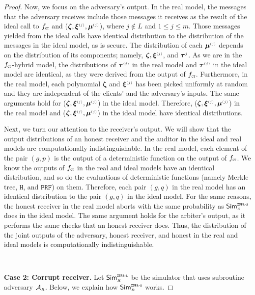 \begin{proof}
 Now, we focus on the adversary’s output. In the real model, the messages that the adversary receives include those messages it receives as the result of the ideal call to $f_{\scriptscriptstyle \mathtt{CT}}$ and (${\bm \zeta}, {\bm\xi}^{\scriptscriptstyle (j)}, \bm\mu^{\scriptscriptstyle (j)}$), where $j \notin L$ and $1\leq j\leq m$. Those messages yielded from the ideal calls have identical distribution to the distribution of the messages in the ideal model, as \ct is secure. The distribution of each $\bm\mu^{\scriptscriptstyle (j)}$ depends on the distribution of its components; namely, ${\bm \zeta}, {\bm\xi}^{\scriptscriptstyle (j)}$, and $\bm \tau^{\scriptscriptstyle j}$. As we are in the $f_{\scriptscriptstyle \mathtt{CT}}$-hybrid model, the distributions of $\bm \tau^{\scriptscriptstyle (j)}$ in the real model and ${\bm \tau}^{\scriptscriptstyle (j)}$ in the ideal model are identical, as they were derived from the output of $f_{\scriptscriptstyle \mathtt{CT}}$. Furthermore, in the real model, each polynomial  ${\bm \zeta}$ and ${\bm\xi}^{\scriptscriptstyle (j)}$ has been picked uniformly at random and they are independent of the clients' and the adversary's inputs. The same arguments hold for  ($ {\bm \zeta}, {\bm\xi}^{\scriptscriptstyle (j)}, {\bm\mu}^{\scriptscriptstyle (j)}$) in the ideal model. Therefore, (${\bm \zeta}, {\bm\xi}^{\scriptscriptstyle (j)}, {\bm\mu}^{\scriptscriptstyle (j)}$) in the real model and ($ {\bm \zeta}, {\bm\xi}^{\scriptscriptstyle (j)}, {\bm\mu}^{\scriptscriptstyle (j)}$) in the ideal model have identical distributions. 
 
 
 
 
 Next, we turn our attention to the receiver’s output. We will show that the output distributions of an honest receiver and the auditor in the ideal and real models are computationally indistinguishable. In the real model,  each element of the pair $(g, p)$ is the output of a deterministic function on the output of $f_{\scriptscriptstyle \mathtt{CT}}$. We know the outputs of $f_{\scriptscriptstyle \mathtt{CT}}$ in the real and ideal models have an identical distribution, and so do the evaluations of deterministic functions (namely Merkle tree, $\mathtt{H}$, and $\mathtt{PRF}$) on them. Therefore, each pair $(g,q)$ in the real model has an identical distribution to the pair $( g, q)$ in the ideal model.  For the same reasons, the honest receiver in the real model aborts with the same probability as  $\mathsf{Sim}^{\scriptscriptstyle \mathtt{ZSPA\text{-}A}}_{\scriptscriptstyle S}$ does in the ideal model.  The same argument holds for the arbiter's output, as it performs the same checks that an honest receiver does.  Thus, the distribution of the joint outputs of the adversary, honest receiver, and honest in the real and ideal models is computationally indistinguishable. 

\

\noindent\textbf{Case 2: Corrupt receiver.}   Let $\mathsf{Sim}^{\scriptscriptstyle \mathtt{ZSPA\text{-}A}}_{\scriptscriptstyle R}$ be the simulator that uses subroutine adversary $\mathcal{A}_{\scriptscriptstyle R}$. Below, we explain how $\mathsf{Sim}^{\scriptscriptstyle \mathtt{ZSPA\text{-}A}}_{\scriptscriptstyle R}$ works. 





\end{proof}
